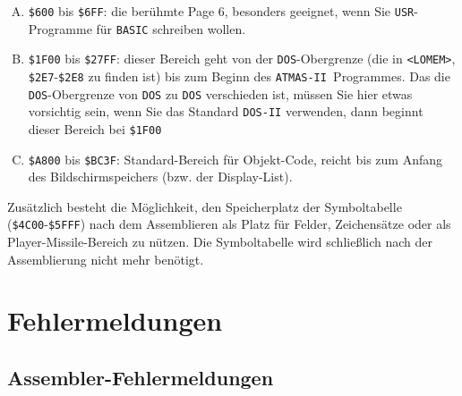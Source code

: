 \documentclass[10pt,a4paper,twoside,final,openright,titlepage]{memoir}
\def\atmas{\texttt{AT\-MAS-II }}
\begin{document}
\begin{enumerate}[A)]
\item \texttt{\$600} bis \texttt{\$6FF}: die berühmte Page 6, besonders
geeignet, wenn Sie \texttt{USR}-Programme für \texttt{BASIC} schreiben
wollen.

\item \texttt{\$1F00} bis \texttt{\$27FF}: dieser Bereich geht von der \texttt{DOS}-Obergrenze
(die in \linebreak\texttt{<LOMEM>}, \texttt{\$2E7}-\texttt{\$2E8} zu finden ist)
bis zum Beginn des \atmas Programmes. Das die \texttt{DOS}-Obergrenze
von \texttt{DOS} zu \texttt{DOS} verschieden ist, müssen Sie
hier etwas vorsichtig sein, wenn Sie das Standard
\texttt{DOS-II} verwenden, dann beginnt dieser Bereich bei
\texttt{\$1F00}

\item \texttt{\$A800} bis \texttt{\$BC3F}: Standard-Bereich für Objekt-Code,
reicht bis zum Anfang des Bildschirmspeichers (bzw.
der Display-List).
\end{enumerate}

Zusätzlich besteht die Möglichkeit, den Speicherplatz
der Symboltabelle (\texttt{\$4C00}-\texttt{\$5FFF}) nach dem Assemblieren
als Platz für Felder, Zeichensätze oder als Player-Missile-Bereich
zu nützen. Die Symboltabelle wird
schließlich nach der Assemblierung nicht mehr benötigt.

\chapter{Fehlermeldungen}

\section{Assembler-Fehlermeldungen}
\end{document}
